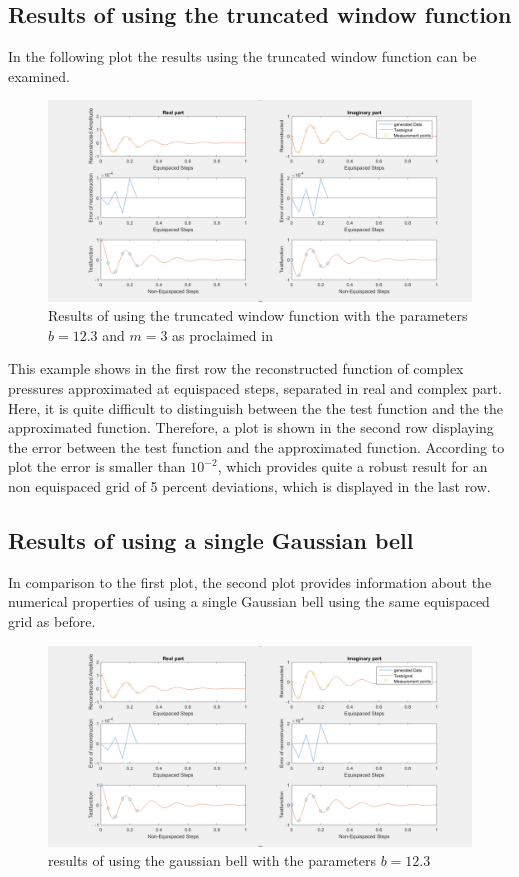 \documentclass[11pt]{report} %
\begin{document}
\subsection{Results of using the truncated window function}
In the following plot the results using the truncated window function can be examined. 

\begin{figure}[H]
\centering
\includegraphics[scale=0.8]{./Figures/plot_trunc}
\caption{Results of using the truncated window function with the parameters $b=12.3$ and $m=3$ as proclaimed in }
\end{figure}

This example shows in the first row the reconstructed function of complex pressures approximated at equispaced steps, separated in real and complex part. 
Here, it is quite difficult to distinguish between the the test function and the the approximated function. 
Therefore, a plot is shown in the second row displaying the error between the test function and the approximated function. 
According to plot the error is smaller than $10^{-2}$, which provides quite a robust result for an non equispaced grid of 5 percent deviations, which is displayed in the last row.


\subsection{Results of using a single Gaussian bell}
In comparison to the first plot, the second plot provides information about the numerical properties of using a single Gaussian bell using the same equispaced grid as before.

\begin{figure}[H]
\centering
\includegraphics[scale=0.8]{./Figures/plot_trunc}
\caption{results of using the gaussian bell with the parameters $b=12.3$}
\end{figure}
\end{document}
